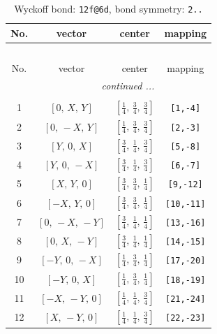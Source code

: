 \documentclass[fleqn,8pt]{jsarticle}
\begin{document}
\renewcommand{\arraystretch}{1.2}
\begin{longtable}{cccc}
\caption{Wyckoff bond: {\tt 12f@6d}, bond symmetry: {\tt 2..}}
 \\
 \hline \hline
No. & vector & center & mapping \\ \hline \endfirsthead

\multicolumn{3}{l}{\tablename\ \thetable{}} \\
 \hline \hline
No. & vector & center & mapping \\ \hline \endhead

 \hline \hline
\multicolumn{3}{r}{\footnotesize\it continued ...} \\ \endfoot

 \hline \hline
\multicolumn{3}{r}{} \\ \endlastfoot

1 & $\left[ 0,\, X,\, Y \right]$ & $\left[ \frac{1}{4},\, \frac{3}{4},\, \frac{3}{4} \right]$ & {\tt [1,-4]} \\ \hline
2 & $\left[ 0,\, - X,\, Y \right]$ & $\left[ \frac{1}{4},\, \frac{3}{4},\, \frac{3}{4} \right]$ & {\tt [2,-3]} \\ \hline
3 & $\left[ Y,\, 0,\, X \right]$ & $\left[ \frac{3}{4},\, \frac{1}{4},\, \frac{3}{4} \right]$ & {\tt [5,-8]} \\ \hline
4 & $\left[ Y,\, 0,\, - X \right]$ & $\left[ \frac{3}{4},\, \frac{1}{4},\, \frac{3}{4} \right]$ & {\tt [6,-7]} \\ \hline
5 & $\left[ X,\, Y,\, 0 \right]$ & $\left[ \frac{3}{4},\, \frac{3}{4},\, \frac{1}{4} \right]$ & {\tt [9,-12]} \\ \hline
6 & $\left[ - X,\, Y,\, 0 \right]$ & $\left[ \frac{3}{4},\, \frac{3}{4},\, \frac{1}{4} \right]$ & {\tt [10,-11]} \\ \hline
7 & $\left[ 0,\, - X,\, - Y \right]$ & $\left[ \frac{3}{4},\, \frac{1}{4},\, \frac{1}{4} \right]$ & {\tt [13,-16]} \\ \hline
8 & $\left[ 0,\, X,\, - Y \right]$ & $\left[ \frac{3}{4},\, \frac{1}{4},\, \frac{1}{4} \right]$ & {\tt [14,-15]} \\ \hline
9 & $\left[ - Y,\, 0,\, - X \right]$ & $\left[ \frac{1}{4},\, \frac{3}{4},\, \frac{1}{4} \right]$ & {\tt [17,-20]} \\ \hline
10 & $\left[ - Y,\, 0,\, X \right]$ & $\left[ \frac{1}{4},\, \frac{3}{4},\, \frac{1}{4} \right]$ & {\tt [18,-19]} \\ \hline
11 & $\left[ - X,\, - Y,\, 0 \right]$ & $\left[ \frac{1}{4},\, \frac{1}{4},\, \frac{3}{4} \right]$ & {\tt [21,-24]} \\ \hline
12 & $\left[ X,\, - Y,\, 0 \right]$ & $\left[ \frac{1}{4},\, \frac{1}{4},\, \frac{3}{4} \right]$ & {\tt [22,-23]} \\
\end{longtable}
\end{document}
